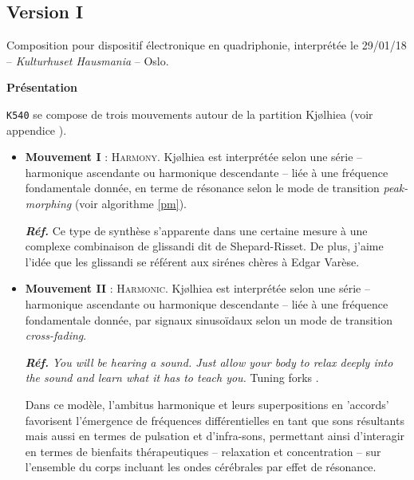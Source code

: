 \subsection[\texttt{v.I}]{Version I}
\label{k540v1}

\smallskip

Composition pour dispositif \'electronique en quadriphonie, 
interpr\'et\'ee le 29/01/18 -- \textit{Kulturhuset Hausmania} -- Oslo.

\bigskip

\noindent \textbf{{\large Pr\'esentation}}
\hrulefill

\bigskip

\texttt{K540} se compose de trois mouvements autour de la partition Kj{\o}lhiea (voir appendice ).

\begin{itemize}[leftmargin=0.4in]
\item \textbf{Mouvement I} : \textsc{Harmony}. Kj{\o}lhiea est interpr\'et\'ee selon une s\'erie -- harmonique ascendante ou harmonique descendante 
 -- li\'ee \`a une fr\'equence fondamentale donn\'ee, en terme de r\'esonance selon le mode de transition \textsl{peak-morphing} (voir algorithme \ref{pm}).

\textbf{\textit{R\'ef.}} Ce type de synth\`ese s'apparente dans une certaine mesure \`a une complexe combinaison de glissandi dit de Shepard-Risset. De plus, j'aime l'id\'ee que les glissandi se r\'ef\'erent aux sir\'enes ch\`eres \`a Edgar Var\`ese.
 \end{itemize}

\begin{itemize}[leftmargin=0.4in]
\item \textbf{Mouvement II} : \textsc{Harmonic}. Kj{\o}lhiea est interpr\'et\'ee selon une s\'erie -- harmonique ascendante ou harmonique descendante 
 -- li\'ee \`a une fr\'equence fondamentale donn\'ee, par signaux sinuso\"idaux selon un mode de transition \textsl{cross-fading}.

\textbf{\textit{R\'ef.}} \textit{You will be hearing a sound. Just allow your body to relax deeply into the sound and learn what it has to teach you.} Tuning forks \citep[pp. 89--99]{hm}.

Dans ce  mod\`ele, 
l'ambitus harmonique et leurs superpositions en 'accords' favorisent l'\'emergence de fr\'equences diff\'erentielles en tant que sons r\'esultants mais aussi en termes de pulsation et d'infra-sons,  permettant ainsi d'interagir en termes de bienfaits th\'erapeutiques -- relaxation et concentration -- sur l'ensemble du corps incluant les ondes c\'er\'ebrales \citep{ocm} par effet de r\'esonance.
 \end{itemize}

